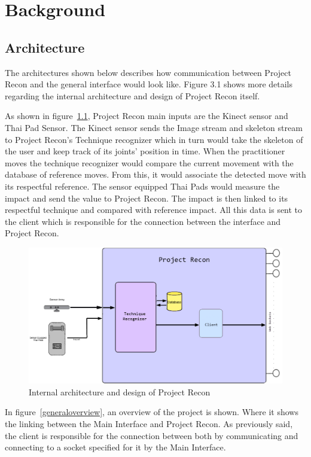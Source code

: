\chapter{Background}\label{chap:background}
\section{Architecture}
The architectures shown below describes how communication between Project Recon and the general interface would look like. Figure 3.1 shows more details regarding the internal architecture and design of Project Recon itself.

As shown in figure~\ref{projectrecondiagram}, Project Recon main inputs are the Kinect sensor and Thai Pad Sensor. The Kinect sensor sends the Image stream and skeleton stream to Project Recon's Technique recognizer which in turn would take the skeleton of the user and keep track of its joints' position in time. When the practitioner moves the technique recognizer would compare the current movement with the database of reference moves. From this, it would associate the detected move with its respectful reference. The sensor equipped Thai Pads would measure the impact and send the value to Project Recon. The impact is then linked to its respectful technique and compared with reference impact. All this data is sent to the client which is responsible for the connection between the interface and Project Recon.

\begin{figure}[!htbp]
\centering
\includegraphics[width=1\textwidth]{images/project_Recon_diagram.png}
\caption{Internal architecture and design of Project Recon}
\label{projectrecondiagram}
\end{figure}

In figure~\ref{generaloverview}, an overview of the project is shown. Where it shows the linking between the Main Interface and Project Recon. As previously said, the client is responsible for the connection between both by communicating and connecting to a socket specified for it by the Main Interface.

